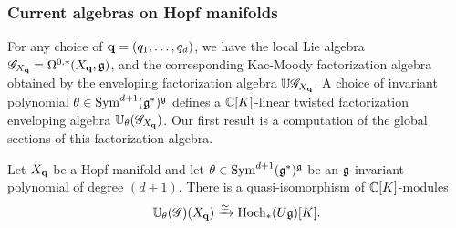 
\subsubsection{Current algebras on Hopf manifolds}

For any choice of ${\bf q} = (q_1,\ldots,q_d)$, we have the local Lie algebra $\mathscr G_{X_{\bf q}} = \Omega^{0,*}(X_{\bf q}, \mathfrak g)$, and the corresponding Kac-Moody factorization algebra obtained by the enveloping factorization algebra $\mathbb U\mathscr G_{X_{\bf q}}$.
A choice of invariant polynomial $\theta \in {\rm Sym}^{d+1}(\mathfrak g^*)^\mathfrak g$ defines a $\mathbb C[K]$-linear twisted factorization enveloping algebra $\mathbb U_{\theta}(\mathscr G_{X_{\bf q}})$.  
Our first result is a computation of the global sections of this factorization algebra.  

\begin{prop}
\label{prop: hopf}
Let $X_{\bf q}$ be a Hopf manifold and let $\theta \in {\rm Sym}^{d+1}(\mathfrak g^*)^\mathfrak g$ be an $\mathfrak g$-invariant polynomial of degree $(d+1)$. 
There is a quasi-isomorphism of $\mathbb C[K]$-modules
\[
\mathbb U_\theta (\mathscr G) (X_{\bf q}) \xrightarrow{\simeq} {\rm Hoch}_*(U \mathfrak g)[K] .
\]
\end{prop}


